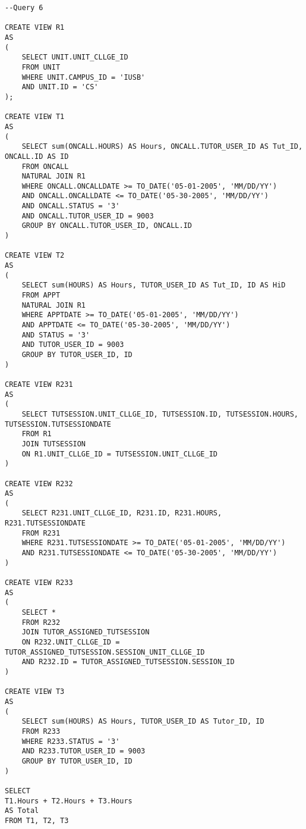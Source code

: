 \documentclass[12pt]{article}
\begin{document}
\begin{lstlisting}
--Query 6

CREATE VIEW R1
AS
(
	SELECT UNIT.UNIT_CLLGE_ID
	FROM UNIT
	WHERE UNIT.CAMPUS_ID = 'IUSB'
	AND UNIT.ID = 'CS'
);

CREATE VIEW T1
AS
(
	SELECT sum(ONCALL.HOURS) AS Hours, ONCALL.TUTOR_USER_ID AS Tut_ID, ONCALL.ID AS ID
	FROM ONCALL
	NATURAL JOIN R1
	WHERE ONCALL.ONCALLDATE >= TO_DATE('05-01-2005', 'MM/DD/YY')
	AND ONCALL.ONCALLDATE <= TO_DATE('05-30-2005', 'MM/DD/YY')
	AND ONCALL.STATUS = '3'
	AND ONCALL.TUTOR_USER_ID = 9003
	GROUP BY ONCALL.TUTOR_USER_ID, ONCALL.ID
)

CREATE VIEW T2
AS
(
	SELECT sum(HOURS) AS Hours, TUTOR_USER_ID AS Tut_ID, ID AS HiD
	FROM APPT
	NATURAL JOIN R1
	WHERE APPTDATE >= TO_DATE('05-01-2005', 'MM/DD/YY')
	AND APPTDATE <= TO_DATE('05-30-2005', 'MM/DD/YY')
	AND STATUS = '3'
	AND TUTOR_USER_ID = 9003
	GROUP BY TUTOR_USER_ID, ID
)

CREATE VIEW R231
AS
(
	SELECT TUTSESSION.UNIT_CLLGE_ID, TUTSESSION.ID, TUTSESSION.HOURS, TUTSESSION.TUTSESSIONDATE
	FROM R1
	JOIN TUTSESSION
	ON R1.UNIT_CLLGE_ID = TUTSESSION.UNIT_CLLGE_ID
)

CREATE VIEW R232
AS
(
	SELECT R231.UNIT_CLLGE_ID, R231.ID, R231.HOURS, R231.TUTSESSIONDATE
	FROM R231
	WHERE R231.TUTSESSIONDATE >= TO_DATE('05-01-2005', 'MM/DD/YY')
	AND R231.TUTSESSIONDATE <= TO_DATE('05-30-2005', 'MM/DD/YY')
)

CREATE VIEW R233
AS
(
	SELECT *
	FROM R232
	JOIN TUTOR_ASSIGNED_TUTSESSION
	ON R232.UNIT_CLLGE_ID = TUTOR_ASSIGNED_TUTSESSION.SESSION_UNIT_CLLGE_ID
	AND R232.ID = TUTOR_ASSIGNED_TUTSESSION.SESSION_ID
)

CREATE VIEW T3
AS
(
	SELECT sum(HOURS) AS Hours, TUTOR_USER_ID AS Tutor_ID, ID
	FROM R233
	WHERE R233.STATUS = '3'
	AND R233.TUTOR_USER_ID = 9003
	GROUP BY TUTOR_USER_ID, ID
)

SELECT 
T1.Hours + T2.Hours + T3.Hours
AS Total
FROM T1, T2, T3
\end{lstlisting}
\end{document}
